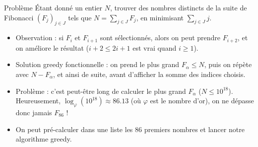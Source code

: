 \begin{frame}
    \frametitle{\problemtitle}
    \begin{block}{Problème}
        Étant donné un entier $N$, trouver des nombres distincts de la suite de Fibonacci $(F_{j})_{j \in J}$ tels que $N = \sum_{j \in J} F_{j}$, en minimisant $\sum_{j \in J} j$.
    \end{block}
    \pause
    \begin{itemize}[<+->]
        \item Observation : si $F_i$ et $F_{i+1}$ sont sélectionnés, alors on peut prendre $F_{i+2}$, et on améliore le résultat ($i+2 \leq 2i+1$ est vrai quand $i \geq 1$).
        \item Solution greedy fonctionnelle : on prend le plus grand $F_\alpha \leq N$, puis on répète avec $N - F_{\alpha}$, et ainsi de suite, avant d'afficher la somme des indices choisis.
        \item Problème : c'est peut-être long de calculer le plus grand $F_\alpha$ ($N \leq 10^{18}$). Heureusement, $\log_{\varphi}(10^{18}) \approx 86.13$ (où $\varphi$ est le nombre d'or), on ne dépasse donc jamais $F_{86}$ !
        \item On peut pré-calculer dans une liste les $86$ premiers nombres et lancer notre algorithme greedy.
    \end{itemize}

\end{frame}